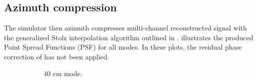 \subsection{Azimuth compression}
The simulator then azimuth compresses multi-channel reconstructed signal with the generalized Stolz interpolation algorithm outlined in .  illustrates the produced Point Spread Functions (PSF) for all modes. In these plots, the residual phase correction of  has not been applied.
\begin{figure}[ht!]
\begin{subfigure}{0.5\textwidth}
\begin{center}
 \caption{40 cm mode.}
 \label{fg:40cmPSF}
 \end{center}
\end{subfigure}
\begin{subfigure}{0.5\textwidth}
\begin{center}

\end{center}
\end{subfigure}
\end{figure}
